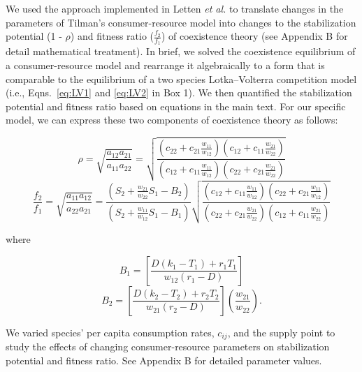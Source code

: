 We used the approach implemented in Letten \textit{et al.}\citep{Letten2017} to translate changes in the parameters of Tilman's consumer-resource model \citep{tilman1982} into changes to the stabilization potential (1 - $\rho$) and fitness ratio ($\frac{f_{2}}{f_{1}}$) of coexistence theory (see Appendix B for detail mathematical treatment). In brief, we solved the coexistence equilibrium of a consumer-resource model and rearrange it algebraically to a form that is comparable to the equilibrium of a two species Lotka--Volterra competition model (i.e., Eqns.~\ref{eq:LV1} and \ref{eq:LV2} in Box 1). We then quantified the stabilization potential and fitness ratio based on equations in the main text. For our specific model, we can express these two components of coexistence theory as follows: 

\begin{equation}
\rho  = \sqrt {\frac{{{a_{12}}{a_{21}}}}{{{a_{11}}{a_{22}}}}}  = \sqrt {\frac{\left (
		c_{22} + c_{21}\frac{w_{11}}{w_{12}}\right )\left ( 
		c_{12} + c_{11}\frac{w_{21}}{w_{22}} \right )}{\left (
		c_{12} + c_{11}\frac{w_{11}}{w_{12}}\right )\left ( 
		c_{22} + c_{21}\frac{w_{21}}{w_{22}} \right )}}
\tag{3.11}\label{eq:3.11}
\end{equation}
\begin{equation}
\frac{{{f_2}}}{{{f_1}}} = \sqrt {\frac{{{a_{11}}{a_{12}}}}{{{a_{22}}{a_{21}}}}}  = \frac{\left (S_{2}+\frac{w_{21}}{w_{22}}S_{1}-B_{2}\right )}{\left (S_{2}+\frac{w_{11}}{w_{12}}S_{1}-B_{1}\right )}\sqrt {\frac{\left (
				c_{12} + c_{11}\frac{w_{11}}{w_{12}}\right )\left ( 
				c_{22} + c_{21}\frac{w_{11}}{w_{12}} \right )}{\left (
				c_{22} + c_{21}\frac{w_{21}}{w_{22}}\right )\left ( 
				c_{12} + c_{11}\frac{w_{21}}{w_{22}} \right )}}
\tag{3.12}\label{eq:3.12}
\end{equation} 
				
where 

\begin{equation}
{B_1} = \left[ {\frac{{D\left( {{k_1} - {T_1}} \right) + {r_1}{T_1}}}{{{w_{12}}\left( {{r_1} - D} \right)}}} \right]
\tag{3.13}\label{eq:3.13}
\end{equation} 
\begin{equation}
{B_2} = \left[ {\frac{{D\left( {{k_2} - {T_2}} \right) + {r_2}{T_2}}}{{{w_{21}}\left( {{r_2} - D} \right)}}} \right]\left( {\frac{{{w_{21}}}}{{{w_{22}}}}} \right).
\tag{3.14}\label{eq:3.14}
\end{equation} 

\noindent We varied species' per capita consumption rates, $c_{ij}$, and the supply point to study the effects of changing consumer-resource parameters on stabilization potential and fitness ratio. See Appendix B for detailed parameter values. 
\par
	

